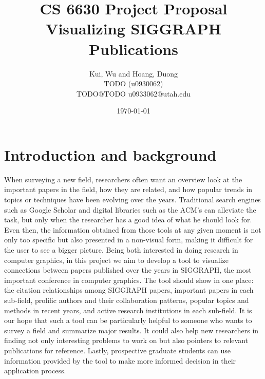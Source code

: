 \documentclass[dvips,12pt]{article}
\begin{document}

\title{CS 6630 Project Proposal\\Visualizing SIGGRAPH Publications}
\author{Kui, Wu and Hoang, Duong\\TODO (u0930062)\\TODO@TODO u0933062@utah.edu}
\date{\today}



\maketitle

\section{Introduction and background}
When surveying a new field, researchers often want an overview look at the important papers in the field, how they are related, and how popular trends in topics or techniques have been evolving over the years. Traditional search engines such as Google Scholar and digital libraries such as the ACM's can alleviate the task, but only when the researcher has a good idea of what he should look for. Even then, the information obtained from those tools at any given moment is not only too specific but also presented in a non-visual form, making it difficult for the user to see a bigger picture. Being both interested in doing research in computer graphics, in this project we aim to develop a tool to visualize connections between papers published over the years in SIGGRAPH, the most important conference in computer graphics. The tool should show in one place: the citation relationships among SIGGRAPH papers, important papers in each sub-field, prolific authors and their collaboration patterns, popular topics and methods in recent years, and active research institutions in each sub-field. It is our hope that such a tool can be particularly helpful to someone who wants to survey a field and summarize major results. It could also help new researchers in finding not only interesting problems to work on but also pointers to relevant publications for reference. Lastly, prospective graduate students can use information provided by the tool to make more informed decision in their application process.
\end{document}
